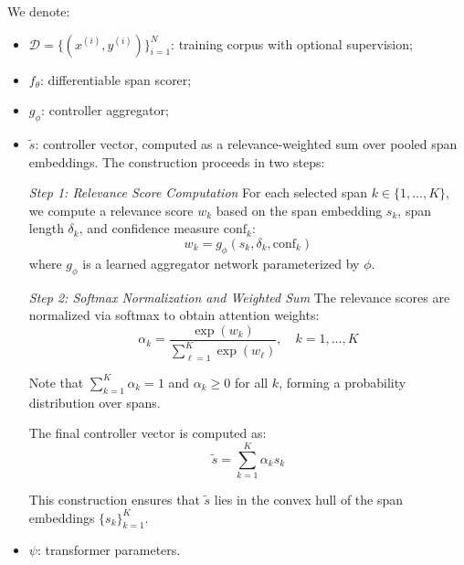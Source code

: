 \vspace{0.5em}
\noindent We denote:
\begin{itemize}[leftmargin=1.6em]
  \item \(\mathcal{D} = \{(x^{(i)}, y^{(i)})\}_{i=1}^{N}\): training corpus with optional supervision;
  \item \(f_\theta\): differentiable span scorer;
  \item \(g_\phi\): controller aggregator;
  \item \(\tilde{s}\): controller vector, computed as a relevance-weighted sum over pooled span embeddings. The construction proceeds in two steps:
  
  \emph{Step 1: Relevance Score Computation}
  For each selected span \(k \in \{1,\ldots,K\}\), we compute a relevance score \(w_k\) based on the span embedding \(s_k\), span length \(\delta_k\), and confidence measure \(\mathrm{conf}_k\):
  \begin{equation}
  w_k = g_\phi(s_k, \delta_k, \mathrm{conf}_k)
  \end{equation}
  where \(g_\phi\) is a learned aggregator network parameterized by \(\phi\).
  
  \emph{Step 2: Softmax Normalization and Weighted Sum}
  The relevance scores are normalized via softmax to obtain attention weights:
  \begin{equation}
  \alpha_k = \frac{\exp(w_k)}{\sum_{\ell=1}^{K} \exp(w_\ell)}, \quad k = 1,\ldots,K
  \label{eq:attention_weights}
  \end{equation}
  
  Note that \(\sum_{k=1}^K \alpha_k = 1\) and \(\alpha_k \ge 0\) for all \(k\), forming a probability distribution over spans.
  
  The final controller vector is computed as:
  \begin{equation}
  \tilde{s} = \sum_{k=1}^{K} \alpha_k s_k
  \label{eq:controller_vector}
  \end{equation}
  
  This construction ensures that \(\tilde{s}\) lies in the convex hull of the span embeddings \(\{s_k\}_{k=1}^K\).
  \item \(\psi\): transformer parameters.
\end{itemize}

